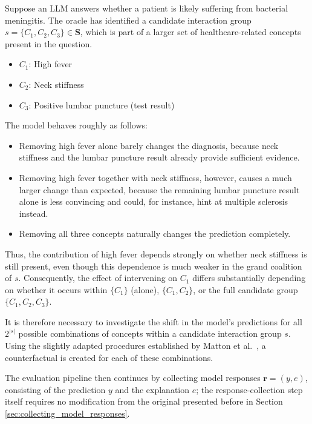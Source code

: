 \begin{example_box}[label=ex:all_combinations_motivation]
	Suppose an LLM answers whether a patient is likely suffering from bacterial meningitis. The oracle has identified a candidate interaction group $s = \{C_1, C_2, C_3\} \in \mathbf{S}$, which is part of a larger set of healthcare-related concepts present in the question.
	\begin{itemize}
		\item $C_1$: High fever
		\item $C_2$: Neck stiffness
		\item $C_3$: Positive lumbar puncture (test result)
	\end{itemize}

	The model behaves roughly as follows:
	\begin{itemize}
		\item Removing high fever alone barely changes the diagnosis, because neck stiffness and the lumbar puncture result already provide sufficient evidence.
		\item Removing high fever together with neck stiffness, however, causes a much larger change than expected, because the remaining lumbar puncture result alone is less convincing and could, for instance, hint at multiple sclerosis instead.
		\item Removing all three concepts naturally changes the prediction completely.
	\end{itemize}
	Thus, the contribution of high fever depends strongly on whether neck stiffness is still present, even though this dependence is much weaker in the grand coalition of $s$. Consequently, the effect of intervening on $C_1$ differs substantially depending on whether it occurs within $\{C_1\}$ (alone), $\{C_1, C_2\}$, or the full candidate group $\{C_1, C_2, C_3\}$.
\end{example_box}


It is therefore necessary to investigate the shift in the model's predictions for all $2^{|s|}$ possible combinations of concepts within a candidate interaction group $s$. Using the slightly adapted procedures established by Matton et al.~\cite{mattonWalkTalkMeasuring2024}, a counterfactual is created for each of these combinations.

The evaluation pipeline then continues by collecting model responses $\mathbf{r}=(y,e)$, consisting of the prediction $y$ and the explanation $e$; the response-collection step itself requires no modification from the original presented before in Section \ref{sec:collecting_model_responses}.

